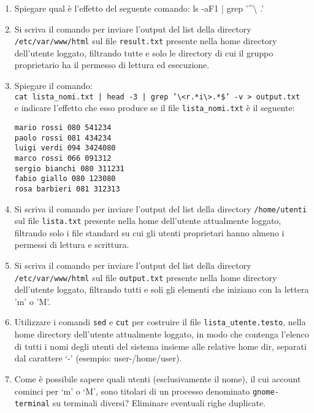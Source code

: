 \documentclass{report}
\begin{document}
\begin{enumerate}
    \item Spiegare qual è l’effetto del seguente comando: ls -aF1 | grep '\textasciicircum \textbackslash
.'
    
    \item Si scriva il comando per inviare l’output del list della directory \texttt{/etc/var/www/html} sul file \texttt{result.txt} presente nella home directory dell’utente loggato, filtrando tutte e solo le directory di cui il gruppo proprietario ha il permesso di lettura ed esecuzione.
    
    \item Spiegare il comando: \\
    \texttt{cat lista\_nomi.txt | head -3 | grep '\textbackslash<r.*i\textbackslash>.*\$' -v > output.txt} \\
    e indicare l’effetto che esso produce se il file \texttt{lista\_nomi.txt} è il seguente:
    \begin{verbatim}
mario rossi 080 541234
paolo rossi 081 434234
luigi verdi 094 3424080
marco rossi 066 091312
sergio bianchi 080 311231
fabio giallo 080 123080
rosa barbieri 081 312313
    \end{verbatim}
    
    \item Si scriva il comando per inviare l’output del list della directory \texttt{/home/utenti} sul file \texttt{lista.txt} presente nella home dell’utente attualmente loggato, filtrando solo i file standard su cui gli utenti proprietari hanno almeno i permessi di lettura e scrittura.
    
    \item Si scriva il comando per inviare l’output del list della directory \texttt{/etc/var/www/html} sul file \texttt{output.txt} presente nella home directory dell’utente loggato, filtrando tutti e soli gli elementi che iniziano con la lettera 'm' o 'M'.
    
    \item Utilizzare i comandi \texttt{sed} e \texttt{cut} per costruire il file \texttt{lista\_utente.testo}, nella home directory dell’utente attualmente loggato, in modo che contenga l’elenco di tutti i nomi degli utenti del sistema insieme alle relative home dir, separati dal carattere ‘-’ (esempio: user-/home/user).
    
    \item Come è possibile sapere quali utenti (esclusivamente il nome), il cui account cominci per ‘m’ o ‘M’, sono titolari di un processo denominato \texttt{gnome-terminal} su terminali diversi? Eliminare eventuali righe duplicate.
    

\end{enumerate}
\end{document}
